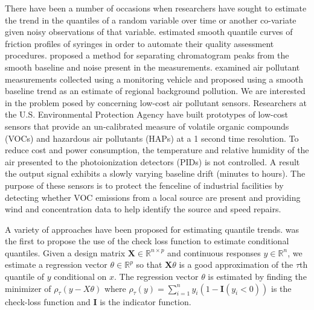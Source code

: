 \documentclass[12pt]{article}
\begin{document}
	There have been a number of occasions when researchers have sought to estimate the trend in the quantiles of a random variable over time or another co-variate given noisy observations of that variable. \cite{nychka1995nonparametric} estimated smooth quantile curves of friction profiles of syringes in order to automate their quality assessment procedures. \cite{Ning2014} proposed a method for separating chromatogram peaks from the smooth baseline and noise present in the measurements. \cite{brantley2014mobile} examined air pollutant measurements collected using a monitoring vehicle and proposed using a smooth baseline trend as an estimate of regional background pollution. We are interested in the problem posed by \cite{thoma2016south} concerning low-cost air pollutant sensors. Researchers at the U.S. Environmental Protection Agency have built prototypes of low-cost sensors that provide an un-calibrated measure of volatile organic compounds (VOCs) and hazardous air pollutants (HAPs) at a 1 second time resolution. To reduce cost and power consumption, the temperature and relative humidity of the air presented to the photoionization detectors (PIDs) is not controlled. A result the output signal exhibits a slowly varying baseline drift (minutes to hours). The purpose of these sensors is to protect the fenceline of industrial facilities by detecting whether VOC emissions from a local source are present and providing wind and concentration data to help identify the source and speed repairs.      	
	
	A variety of approaches have been proposed for estimating quantile trends. \cite{Koenker1978} was the first to propose the use of the check loss function to estimate conditional quantiles. Given a design matrix $\mathbf{X} \in \mathbb{R}^{n \times p}$ and continuous responses $y \in \mathbb{R}^n$, we estimate a regression vector $\theta \in \mathbb{R}^p$ so that $\mathbf{X}\theta$ is a good approximation of the $\tau$th quantile of $y$ conditional on $x$. The regression vector $\theta$ is estimated by finding the minimizer of $\rho_{\tau}(y-X\theta)$ where $\rho_{\tau}(y) = \sum_{i=1}^n y_i(1-\mathbf{I}(y_i<0))$ is the check-loss function and $\mathbf{I}$ is the indicator function.  
	
\end{document}
